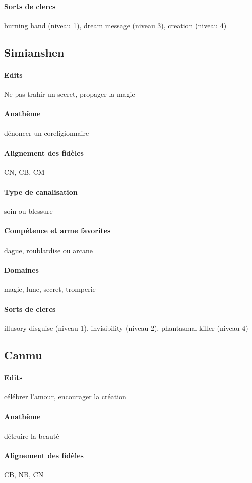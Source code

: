 \documentclass[10pt,a4paper]{book}
\begin{document}
\paragraph{Sorts de clercs}burning hand (niveau 1), dream message (niveau 3), creation (niveau 4)
\subsection{Simianshen}
\paragraph{Edits}Ne pas trahir un secret, propager la magie
\paragraph{Anathème}dénoncer un coreligionnaire
\paragraph{Alignement des fidèles}CN, CB, CM
\paragraph{Type de canalisation}soin ou blessure
\paragraph{Compétence et arme favorites}dague, roublardise ou arcane
\paragraph{Domaines}magie, lune, secret, tromperie
\paragraph{Sorts de clercs}illusory disguise (niveau 1), invisibility (niveau 2), phantasmal killer (niveau 4)
\subsection{Canmu}
\paragraph{Edits}célébrer l'amour, encourager la création
\paragraph{Anathème}détruire la beauté
\paragraph{Alignement des fidèles}CB, NB, CN
\end{document}
